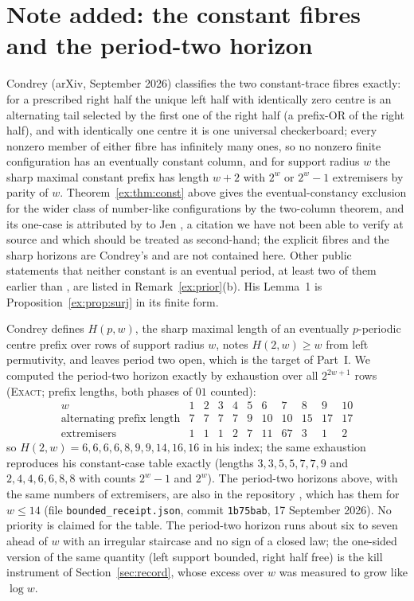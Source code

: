\documentclass[11pt]{article}
\theoremstyle{definition}
\theoremstyle{remark}
\newcommand{\EXACT}{\textsc{Exact}}
\begin{document}
\section{Note added: the constant fibres and the period-two horizon}\label{ex:condrey}

Condrey \cite{Condrey} (arXiv, September 2026) classifies the two constant-trace fibres exactly: for a prescribed right half the unique left half with identically zero centre is an alternating tail selected by the first one of the right half (a prefix-OR of the right half), and with identically one centre it is one universal checkerboard; every nonzero member of either fibre has infinitely many ones, so no nonzero finite configuration has an eventually constant column, and for support radius $w$ the sharp maximal constant prefix has length $w+2$ with $2^w$ or $2^w-1$ extremisers by parity of $w$. Theorem~\ref{ex:thm:const} above gives the eventual-constancy exclusion for the wider class of number-like configurations by the two-column theorem, and its one-case is attributed by \cite{Condrey} to Jen \cite[Thm.~7a]{Jen86}, a citation we have not been able to verify at source and which should be treated as second-hand; the explicit fibres and the sharp horizons are Condrey's and are not contained here. Other public statements that neither constant is an eventual period, at least two of them earlier than \cite{Condrey}, are listed in Remark~\ref{ex:prior}(b). His Lemma~1 is Proposition~\ref{ex:prop:surj} in its finite form.

Condrey defines $H(p,w)$, the sharp maximal length of an eventually $p$-periodic centre prefix over rows of support radius $w$, notes $H(2,w)\ge w$ from left permutivity, and leaves period two open, which is the target of Part~I. We computed the period-two horizon exactly by exhaustion over all $2^{2w+1}$ rows (\EXACT; prefix lengths, both phases of $01$ counted):
\[
\begin{array}{c|cccccccccc}
w & 1&2&3&4&5&6&7&8&9&10\\ \hline
\text{alternating prefix length} & 7&7&7&7&9&10&10&15&17&17\\
\text{extremisers} & 1&1&1&2&7&11&67&3&1&2
\end{array}
\]
so $H(2,w)=6,6,6,6,8,9,9,14,16,16$ in his index; the same exhaustion reproduces his constant-case table exactly (lengths $3,3,5,5,7,7,9$ and $2,4,4,6,6,8,8$ with counts $2^w-1$ and $2^w$). The period-two horizons above, with the same numbers of extremisers, are also in the repository \cite{Commons}, which has them for $w\le14$ (file \texttt{bounded\_receipt.json}, commit \texttt{1b75bab}, 17 September 2026). No priority is claimed for the table. The period-two horizon runs about six to seven ahead of $w$ with an irregular staircase and no sign of a closed law; the one-sided version of the same quantity (left support bounded, right half free) is the kill instrument of Section~\ref{sec:record}, whose excess over $w$ was measured to grow like $\log w$.
\end{document}
